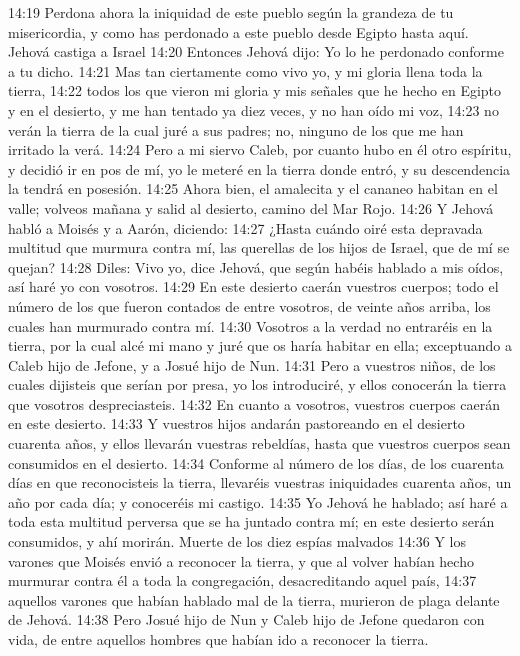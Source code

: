 14:19 Perdona ahora la iniquidad de este pueblo según la grandeza de tu misericordia, y como has perdonado a este pueblo desde Egipto hasta aquí. 
Jehová castiga a Israel   
14:20 Entonces Jehová dijo: Yo lo he perdonado conforme a tu dicho.  
14:21 Mas tan ciertamente como vivo yo, y mi gloria llena toda la tierra,  
14:22 todos los que vieron mi gloria y mis señales que he hecho en Egipto y en el desierto, y me han tentado ya diez veces, y no han oído mi voz,  
14:23 no verán la tierra de la cual juré a sus padres; no, ninguno de los que me han irritado la verá.  
14:24 Pero a mi siervo Caleb, por cuanto hubo en él otro espíritu, y decidió ir en pos de mí, yo le meteré en la tierra donde entró, y su descendencia la tendrá en posesión.  
14:25 Ahora bien, el amalecita y el cananeo habitan en el valle; volveos mañana y salid al desierto, camino del Mar Rojo.  
14:26 Y Jehová habló a Moisés y a Aarón, diciendo:  
14:27 ¿Hasta cuándo oiré esta depravada multitud que murmura contra mí, las querellas de los hijos de Israel, que de mí se quejan?  
14:28 Diles: Vivo yo, dice Jehová, que según habéis hablado a mis oídos, así haré yo con vosotros. 
14:29 En este desierto caerán vuestros cuerpos; todo el número de los que fueron contados de entre vosotros, de veinte años arriba, los cuales han murmurado contra mí.  
14:30 Vosotros a la verdad no entraréis en la tierra, por la cual alcé mi mano y juré que os haría habitar en ella; exceptuando a Caleb hijo de Jefone, y a Josué hijo de Nun.  
14:31 Pero a vuestros niños, de los cuales dijisteis que serían por presa, yo los introduciré, y ellos conocerán la tierra que vosotros despreciasteis.  
14:32 En cuanto a vosotros, vuestros cuerpos caerán en este desierto.  
14:33 Y vuestros hijos andarán pastoreando en el desierto cuarenta años, y ellos llevarán vuestras rebeldías, hasta que vuestros cuerpos sean consumidos en el desierto.  
14:34 Conforme al número de los días, de los cuarenta días en que reconocisteis la tierra, llevaréis vuestras iniquidades cuarenta años, un año por cada día; y conoceréis mi castigo.  
14:35 Yo Jehová he hablado; así haré a toda esta multitud perversa que se ha juntado contra mí; en este desierto serán consumidos, y ahí morirán.  
Muerte de los diez espías malvados  
14:36 Y los varones que Moisés envió a reconocer la tierra, y que al volver habían hecho murmurar contra él a toda la congregación, desacreditando aquel país,  
14:37 aquellos varones que habían hablado mal de la tierra, murieron de plaga delante de Jehová.  
14:38 Pero Josué hijo de Nun y Caleb hijo de Jefone quedaron con vida, de entre aquellos hombres que habían ido a reconocer la tierra.  
